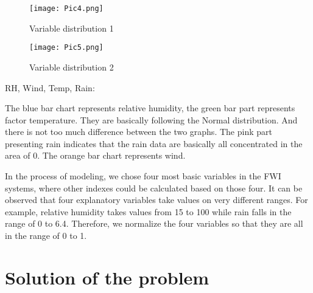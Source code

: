 \documentclass[12pt]{article}
\theoremstyle{plain}
\begin{document}
\begin{spacing}{1}
\begin{flushleft}
 \vspace{2.0mm}
 
 
   \begin{figure}[htp]
 	\centering  
 	\texttt{[image: Pic4.png]}
 	\caption{Variable distribution 1}
 	\label{fig:figure1label}
 \end{figure}
 
 \vspace{2.0mm}
 
 
   \begin{figure}[htp]
 	\centering  
 	\texttt{[image: Pic5.png]}
 	\caption{Variable distribution 2}
 	\label{fig:figure1label}
 \end{figure}
 
 \vspace{4.0mm}
 
 RH, Wind, Temp, Rain:
 
\vspace{2.0mm}
  
 The blue bar chart represents relative humidity, the green bar part represents factor temperature. They are basically following the Normal distribution. And there is not too much difference between the two graphs. The pink part presenting rain indicates that the rain data are basically all concentrated in the area of 0. The orange bar chart represents wind. 
 
\vspace{2.0mm}
 
 In the process of modeling, we chose four most basic variables in the FWI systems, where other indexes could be calculated based on those four. It can be observed that four explanatory variables take values on very different ranges. For example, relative humidity takes values from 15 to 100 while rain falls in the range of 0 to 6.4. Therefore, we normalize the four variables so that they are all in the range of 0 to 1. 
 
 
 
 
 
 \vspace{2.0mm}
 
 
 
 
 
 
 
 
 
 
 
  \newpage
 
 \section{Solution of the problem}
 

\end{flushleft}
\end{spacing}
\end{document}
